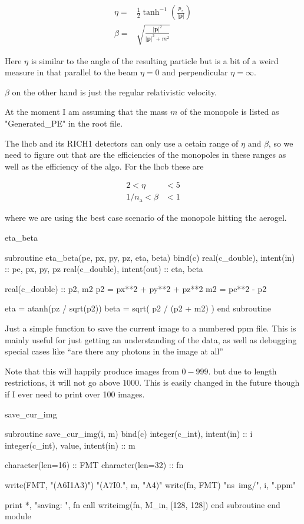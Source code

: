 \documentclass[10pt, a4paper]{article}
\begin{document}
\begin{align}
\eta =& \frac{1}{2} \tanh^{-1}\left( \frac{p_z}{\lvert \mathbf{p}\rvert} \right) \\
\beta =& \sqrt{\frac{\lvert \mathbf{p}\rvert ^2}{\lvert \mathbf{p}\rvert^2 + m^2}}
\end{align}

Here $\eta$ is similar to the angle of the resulting particle but is a bit of a weird measure in that parallel to the beam $\eta =0$ and perpendicular $\eta=\infty$. 

$\beta$ on the other hand is just the regular relativistic velocity.

At the moment I am assuming that the mass $m$ of the monopole is listed as "Generated_PE" in the root file. 

The lhcb and its RICH1 detectors can only use a cetain range of $\eta$ and $\beta$, so we need to figure out that are the efficiencies of the monopoles in these ranges as well as the efficiency of the algo. For the lhcb these are

\begin{align}
 2 < \eta& < 5\\
 1/n_\text{a} < \beta& < 1
\end{align}

where we are using the best case scenario of the monopole hitting the aerogel. 

\begin{codeblock}{eta_beta}
\begin{code}
subroutine eta_beta(pe, px, py, pz, eta, beta) bind(c)
	real(c_double), intent(in)  :: pe, px, py, pz
	real(c_double), intent(out) :: eta, beta
	
	real(c_double) :: p2, m2
	p2 = px**2 + py**2 + pz**2
	m2 = pe**2 - p2
	
	eta =  atanh(pz / sqrt(p2))
	beta = sqrt( p2 / (p2 + m2) )
end subroutine
\end{code}
\end{codeblock}

Just a simple function to save the current image to a numbered ppm file. This is mainly useful for just getting an understanding of the data, as well as debugging special cases like ``are there any photons in the image at all''

Note that this will happily produce images from $0-999$. but due to length restrictions, it will not go above $1000$. This is easily changed in the future though if I ever need to print over 100 images.

\begin{codeblock}{save_cur_img}
\begin{code}
subroutine save_cur_img(i, m) bind(c)
	integer(c_int), intent(in) :: i
	integer(c_int), value, intent(in) :: m 
	
	character(len=16) :: FMT
	character(len=32) :: fn
	
	write(FMT, "(A6I1A3)") "(A7I0.", m, "A4)"
	write(fn, FMT) "ns~img/", i, ".ppm"
	
	print *, "saving: ", fn 
	call writeimg(fn, M_in, [128, 128])
end subroutine
end module
\end{code}
\end{codeblock}

\printindex
\end{document}
